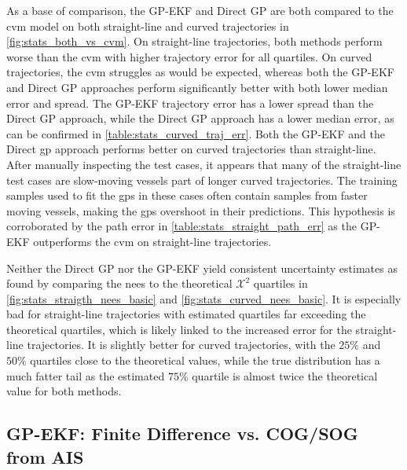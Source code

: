 As a base of comparison, the GP-EKF and Direct GP are both compared to the \acrshort{cvm} model on both straight-line and curved trajectories in \cref{fig:stats_both_vs_cvm}. On straight-line trajectories, both methods perform worse than the \acrshort{cvm} with higher trajectory error for all quartiles. On curved trajectories, the \acrshort{cvm} struggles as would be expected, whereas both the GP-EKF and Direct GP approaches perform significantly better with both lower median error and spread. The GP-EKF trajectory error has a lower spread than the Direct GP approach, while the Direct GP approach has a lower median error, as can be confirmed in \cref{table:stats_curved_traj_err}. Both the GP-EKF and the Direct \acrshort{gp} approach performs better on curved trajectories than straight-line. After manually inspecting the test cases, it appears that many of the straight-line test cases are slow-moving vessels part of longer curved trajectories.  The training samples used to fit the \acrshort{gp}s in these cases often contain samples from faster moving vessels, making the \acrshort{gp}s overshoot in their predictions. This hypothesis is corroborated by the path error in \cref{table:stats_straight_path_err} as the GP-EKF outperforms the \acrshort{cvm} on straight-line trajectories.

Neither the Direct GP nor the GP-EKF yield consistent uncertainty estimates as found by comparing the \acrshort{nees} to the theoretical $\mathcal{X}^2$ quartiles in \cref{fig:stats_straigth_nees_basic} and \cref{fig:stats_curved_nees_basic}. It is especially bad for straight-line trajectories with estimated quartiles far exceeding the theoretical quartiles, which is likely linked to the increased error for the straight-line trajectories. It is slightly better for curved trajectories, with the $25\%$ and $50\%$ quartiles close to the theoretical values, while the true distribution has a much fatter tail as the estimated $75\%$ quartile is almost twice the theoretical value for both methods.

\subsection{GP-EKF: Finite Difference vs. COG/SOG from AIS}

